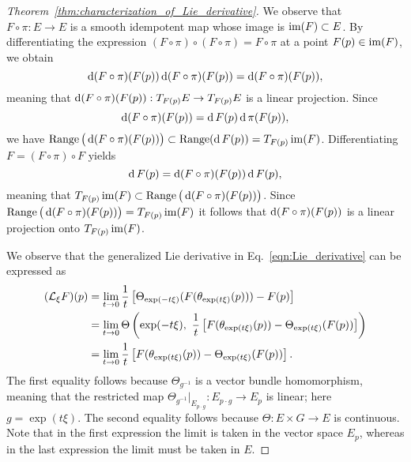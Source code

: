 \documentclass[twoside,11pt]{article}
\begin{document}
\begin{proof}[Theorem~\ref{thm:characterization_of_Lie_derivative}]
We observe that $F\circ\pi:E \to E$ is a smooth idempotent map whose image is $\operatorname{im}(F) \subset E$.
By differentiating the expression $(F\circ\pi) \circ (F \circ\pi) = F\circ \pi$ at a point $F(p) \in \operatorname{im}(F)$, we obtain
\begin{equation}
    \operatorname{\mathrm{d}} (F\circ\pi)(F(p)) \operatorname{\mathrm{d}} (F\circ\pi)(F(p)) = \operatorname{\mathrm{d}} (F\circ\pi)(F(p)),
\end{equation}
meaning that $\operatorname{\mathrm{d}} (F\circ\pi)(F(p)):T_{F(p)}E \to T_{F(p)}E$ is a linear projection.
Since 
\begin{equation}
    \operatorname{\mathrm{d}} (F\circ\pi)(F(p)) = \operatorname{\mathrm{d}} F(p) \operatorname{\mathrm{d}} \pi(F(p)),
\end{equation}
we have $\operatorname{Range}\big(\operatorname{\mathrm{d}} (F\circ\pi)(F(p))\big) \subset \operatorname{Range}(\operatorname{\mathrm{d}} F(p)) = T_{F(p)}\operatorname{im}(F)$.
Differentiating $F = (F\circ\pi)\circ F$ yields 
\begin{equation}
    \operatorname{\mathrm{d}} F(p) = \operatorname{\mathrm{d}} (F\circ \pi)(F(p)) \operatorname{\mathrm{d}} F(p),
\end{equation}
meaning that $T_{F(p)}\operatorname{im}(F) \subset \operatorname{Range}\big(\operatorname{\mathrm{d}} (F\circ\pi)(F(p))\big)$.
Since $\operatorname{Range}\big(\operatorname{\mathrm{d}} (F\circ\pi)(F(p))\big) = T_{F(p)}\operatorname{im}(F)$ it follows that $\operatorname{\mathrm{d}} (F\circ\pi)(F(p))$ is a linear projection onto $T_{F(p)}\operatorname{im}(F)$. 

We observe that the generalized Lie derivative in Eq.~\ref{eqn:Lie_derivative} can be expressed as
\begin{equation}
    \begin{aligned}
        (\mcal{L}_{\xi} F)(p) &= \lim_{t\to 0} \frac{1}{t}\left[ \Theta_{\exp(-t\xi)}(F( \theta_{\exp(t\xi)}(p))) - F(p) \right] \\
        &= \lim_{t\to 0} \Theta\left(\exp(-t\xi), \ \frac{1}{t}\left[ F(\theta_{\exp(t\xi)}(p)) - \Theta_{\exp(t\xi)}(F(p)) \right] \right) \\
        &= \lim_{t\to 0} \frac{1}{t}\left[ F(\theta_{\exp(t\xi)}(p)) - \Theta_{\exp(t\xi)}(F(p)) \right].
    \end{aligned}
\end{equation}
The first equality follows because $\Theta_{g^{-1}}$ is a vector bundle homomorphism, meaning that the restricted map $\Theta_{g^{-1}}\vert_{E_{p\cdot g}}: E_{p\cdot g} \to E_p$ is linear; here $g = \exp(t\xi)$.
The second equality follows because $\Theta: E \times G \to E$ is continuous.
Note that in the first expression the limit is taken in the vector space $E_p$, whereas in the last expression the limit must be taken in $E$.


\end{proof}
\end{document}
